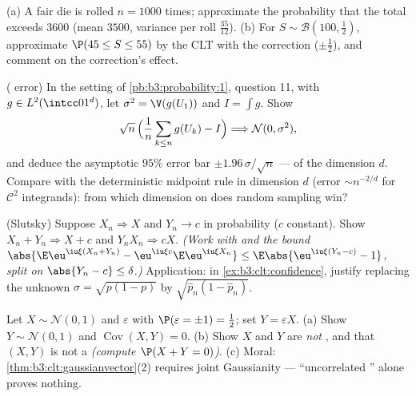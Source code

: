 \begin{exercise}[$\star\star$]\label{exo:b3:clt:6}
(a) A fair die is rolled $n = 1000$ times; approximate the
probability that the total exceeds $3600$ (mean $3500$,
variance per roll $\frac{35}{12}$).
(b) For $S \sim \mathcal B(100, \frac12)$, approximate
$\P(45 \leq S \leq 55)$ by the CLT with the 
correction ($\pm\frac12$), and comment on the correction's
effect.
\end{exercise}

\begin{exercise}[$\star\star$]\label{exo:b3:clt:7}
( error) In the setting of
\cref{pb:b3:probability:1}, question 11, with $g \in
L^2(\intcc01^d)$, let $\sigma^2 = \V(g(U_1))$ and $I = \int
g$. Show
\[
\sqrt n\,\Bigl(\frac1n\sum_{k\leq n}g(U_k) - I\Bigr)
\Longrightarrow \mathcal N(0, \sigma^2),
\]
and deduce the asymptotic $95\%$ error bar $\pm
1.96\,\sigma/\sqrt n$ ---  of the dimension $d$.
Compare with the deterministic midpoint rule in dimension
$d$ (error $\sim n^{-2/d}$ for $\mathcal C^2$ integrands):
from which dimension on does random sampling win?
\end{exercise}

\begin{exercise}[$\star\star\star$]\label{exo:b3:clt:8}
(Slutsky) Suppose $X_n \Rightarrow X$ and $Y_n \to c$ in
probability ($c$ constant). Show $X_n + Y_n \Rightarrow X +
c$ and $Y_nX_n \Rightarrow cX$. \emph{(Work with
 and the bound $\abs{\E\eu^{\iu\xi
(X_n+Y_n)} - \eu^{\iu\xi c}\E\eu^{\iu\xi X_n}} \leq
\E\abs{\eu^{\iu\xi(Y_n - c)} - 1}$, split on $\abs{Y_n - c}
\leq \delta$.)} Application: in
\cref{ex:b3:clt:confidence}, justify replacing the unknown
$\sigma = \sqrt{p(1-p)}$ by $\sqrt{\hat p_n(1 - \hat
p_n)}$.
\end{exercise}

\begin{exercise}[$\star\star\star$]\label{exo:b3:clt:9}
Let $X \sim \mathcal N(0,1)$ and $\varepsilon$ 
with $\P(\varepsilon = \pm1) = \frac12$; set $Y =
\varepsilon X$.
(a) Show $Y \sim \mathcal N(0,1)$ and
$\operatorname{Cov}(X, Y) = 0$.
(b) Show $X$ and $Y$ are \emph{not} , and that
$(X, Y)$ is not a  \emph{(compute $\P(X + Y =
0)$)}.
(c) Moral: \cref{thm:b3:clt:gaussianvector}(2) requires
joint Gaussianity --- ``uncorrelated '' alone
proves nothing.
\end{exercise}

